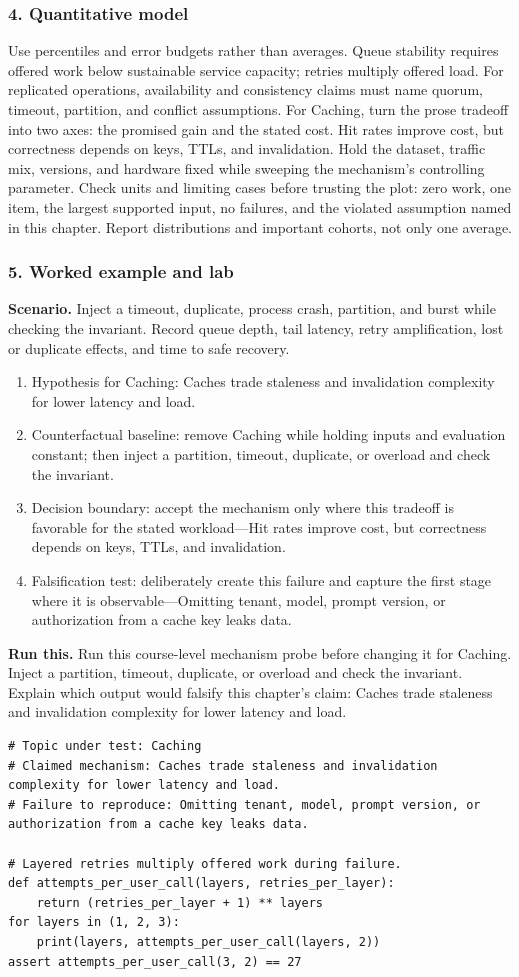 \subsubsection*{4. Quantitative model}
Use percentiles and error budgets rather than averages. Queue stability requires offered work below sustainable service capacity; retries multiply offered load. For replicated operations, availability and consistency claims must name quorum, timeout, partition, and conflict assumptions.
For Caching, turn the prose tradeoff into two axes: the promised gain and the stated cost. Hit rates improve cost, but correctness depends on keys, TTLs, and invalidation. Hold the dataset, traffic mix, versions, and hardware fixed while sweeping the mechanism's controlling parameter.
Check units and limiting cases before trusting the plot: zero work, one item, the largest supported input, no failures, and the violated assumption named in this chapter. Report distributions and important cohorts, not only one average.
\subsubsection*{5. Worked example and lab}
\textbf{Scenario.} Inject a timeout, duplicate, process crash, partition, and burst while checking the invariant. Record queue depth, tail latency, retry amplification, lost or duplicate effects, and time to safe recovery.
\begin{enumerate}
\item Hypothesis for Caching: Caches trade staleness and invalidation complexity for lower latency and load.
\item Counterfactual baseline: remove Caching while holding inputs and evaluation constant; then inject a partition, timeout, duplicate, or overload and check the invariant.
\item Decision boundary: accept the mechanism only where this tradeoff is favorable for the stated workload—Hit rates improve cost, but correctness depends on keys, TTLs, and invalidation.
\item Falsification test: deliberately create this failure and capture the first stage where it is observable—Omitting tenant, model, prompt version, or authorization from a cache key leaks data.
\end{enumerate}
\textbf{Run this.} Run this course-level mechanism probe before changing it for Caching. Inject a partition, timeout, duplicate, or overload and check the invariant. Explain which output would falsify this chapter's claim: Caches trade staleness and invalidation complexity for lower latency and load.
\begin{Verbatim}[fontsize=\scriptsize]
# Topic under test: Caching
# Claimed mechanism: Caches trade staleness and invalidation complexity for lower latency and load.
# Failure to reproduce: Omitting tenant, model, prompt version, or authorization from a cache key leaks data.

# Layered retries multiply offered work during failure.
def attempts_per_user_call(layers, retries_per_layer):
    return (retries_per_layer + 1) ** layers
for layers in (1, 2, 3):
    print(layers, attempts_per_user_call(layers, 2))
assert attempts_per_user_call(3, 2) == 27
\end{Verbatim}
